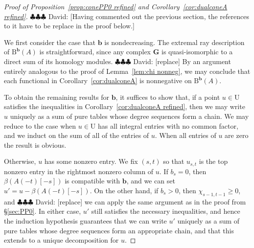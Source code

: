 \documentclass[12pt]{amsart}
\theoremstyle{definition}
\theoremstyle{remark}
\newcommand{\UU}{\mathrm{U}}
\newcommand{\bb}{\mathbf{b}}
\newcommand{\Gbull}{\mathbf{G}}
\newcommand{\BBQ}{\mathrm{B}}
\newcommand{\david}[1]{{\color{red} \sf $\clubsuit\clubsuit\clubsuit$ David: [#1]}}
\begin{document}
\begin{proof}[Proof of Proposition~\ref{prop:conePP0 refined} and Corollary~\ref{cor:dualconeA refined}]
\david{Having commented out the previous section, the references to it have to be replace in the proof below.} 

We first consider the case that $\bb$ is nondecreasing.  The extremal ray description of $\BBQ^{\bb}(A)$ is straightforward, since any complex $\Gbull$ is quasi-isomorphic to a direct sum of its homology modules.  \david{replace} By an argument entirely analogous to the proof of Lemma~\ref{lem:chi nonneg}, we may conclude that each functional in Corollary~\ref{cor:dualconeA} is nonnegative on $\BBQ^{\bb}(A)$.

To obtain the remaining results for $\bb$, it suffices to show that, if a point $u\in \UU$ satisfies the inequalities in Corollary~\ref{cor:dualconeA refined}, then we may write $u$ uniquely as a sum of pure tables whose degree sequences form a chain.  We may reduce to the case when $u\in \UU$ has all integral entries with no common factor, and we induct on the sum of all of the entries of $u$.  When all entries of $u$ are zero the result is obvious. 

Otherwise, $u$ has some nonzero entry.  We fix $(s,t)$ so that $u_{s,t}$ is the top nonzero entry in the rightmost nonzero column of $u$.  If $b_s=0$, then $\beta(A(-t)[-s])$ is compatible with $\bb$, and we can set $u'=u-\beta(A(-t)[-s])$.  On the other hand, if $b_s>0$, then $\chi_{s-1,t-1}\geq 0$, and \david{replace} we can apply the same argument as in the proof from \S\ref{sec:PP0}.  In either case, $u'$ still satisfies the necessary inequalities, and hence the induction hypothesis guarantees that we can write $u'$ uniquely as a sum of pure tables whose degree sequences form an appropriate chain, and that this extends to a unique decomposition for $u$.


\end{proof}
\end{document}
